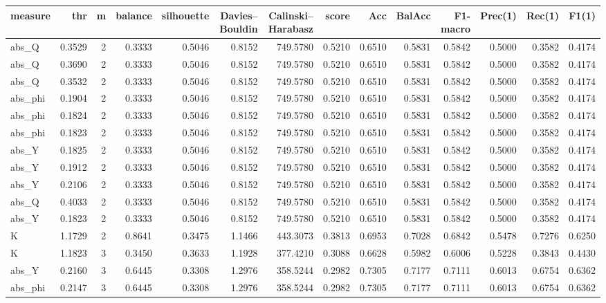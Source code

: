 \begin{tabular}{lrrrrrrrrrrrrr}
\toprule
measure & thr & m & balance & silhouette & Davies--Bouldin & Calinski--Harabasz & score & Acc & BalAcc & F1-macro & Prec(1) & Rec(1) & F1(1) \\
\midrule
abs\_Q & 0.3529 & 2 & 0.3333 & 0.5046 & 0.8152 & 749.5780 & 0.5210 & 0.6510 & 0.5831 & 0.5842 & 0.5000 & 0.3582 & 0.4174 \\
abs\_Q & 0.3690 & 2 & 0.3333 & 0.5046 & 0.8152 & 749.5780 & 0.5210 & 0.6510 & 0.5831 & 0.5842 & 0.5000 & 0.3582 & 0.4174 \\
abs\_Q & 0.3532 & 2 & 0.3333 & 0.5046 & 0.8152 & 749.5780 & 0.5210 & 0.6510 & 0.5831 & 0.5842 & 0.5000 & 0.3582 & 0.4174 \\
abs\_phi & 0.1904 & 2 & 0.3333 & 0.5046 & 0.8152 & 749.5780 & 0.5210 & 0.6510 & 0.5831 & 0.5842 & 0.5000 & 0.3582 & 0.4174 \\
abs\_phi & 0.1824 & 2 & 0.3333 & 0.5046 & 0.8152 & 749.5780 & 0.5210 & 0.6510 & 0.5831 & 0.5842 & 0.5000 & 0.3582 & 0.4174 \\
abs\_phi & 0.1823 & 2 & 0.3333 & 0.5046 & 0.8152 & 749.5780 & 0.5210 & 0.6510 & 0.5831 & 0.5842 & 0.5000 & 0.3582 & 0.4174 \\
abs\_Y & 0.1825 & 2 & 0.3333 & 0.5046 & 0.8152 & 749.5780 & 0.5210 & 0.6510 & 0.5831 & 0.5842 & 0.5000 & 0.3582 & 0.4174 \\
abs\_Y & 0.1912 & 2 & 0.3333 & 0.5046 & 0.8152 & 749.5780 & 0.5210 & 0.6510 & 0.5831 & 0.5842 & 0.5000 & 0.3582 & 0.4174 \\
abs\_Y & 0.2106 & 2 & 0.3333 & 0.5046 & 0.8152 & 749.5780 & 0.5210 & 0.6510 & 0.5831 & 0.5842 & 0.5000 & 0.3582 & 0.4174 \\
abs\_Q & 0.4033 & 2 & 0.3333 & 0.5046 & 0.8152 & 749.5780 & 0.5210 & 0.6510 & 0.5831 & 0.5842 & 0.5000 & 0.3582 & 0.4174 \\
abs\_Y & 0.1823 & 2 & 0.3333 & 0.5046 & 0.8152 & 749.5780 & 0.5210 & 0.6510 & 0.5831 & 0.5842 & 0.5000 & 0.3582 & 0.4174 \\
K & 1.1729 & 2 & 0.8641 & 0.3475 & 1.1466 & 443.3073 & 0.3813 & 0.6953 & 0.7028 & 0.6842 & 0.5478 & 0.7276 & 0.6250 \\
K & 1.1823 & 3 & 0.3450 & 0.3633 & 1.1928 & 377.4210 & 0.3088 & 0.6628 & 0.5982 & 0.6006 & 0.5228 & 0.3843 & 0.4430 \\
abs\_Y & 0.2160 & 3 & 0.6445 & 0.3308 & 1.2976 & 358.5244 & 0.2982 & 0.7305 & 0.7177 & 0.7111 & 0.6013 & 0.6754 & 0.6362 \\
abs\_phi & 0.2147 & 3 & 0.6445 & 0.3308 & 1.2976 & 358.5244 & 0.2982 & 0.7305 & 0.7177 & 0.7111 & 0.6013 & 0.6754 & 0.6362 \\

\end{tabular}
